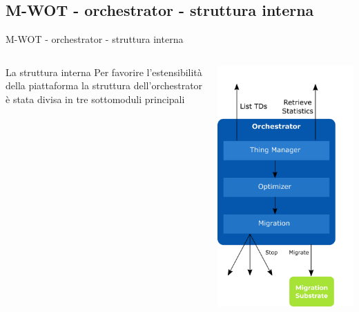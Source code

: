 \documentclass{beamer}
\begin{document}
\subsection{M-WOT - orchestrator - struttura interna}
\begin{frame}{M-WOT - orchestrator - struttura interna}
	\begin{columns}
	\begin{column}[c]{0.5\textwidth}
	\begin{block}{La struttura interna}
	Per favorire l'estensibilità della piattaforma la struttura dell'orchestrator è stata divisa in tre sottomoduli principali
\end{block}
	\end{column}
	\begin{column}[c]{0.35\textwidth}
		\centering
		\includegraphics[width=\textwidth]{./images/8.png}
	\end{column}
\end{columns}
\end{frame}
\end{document}
